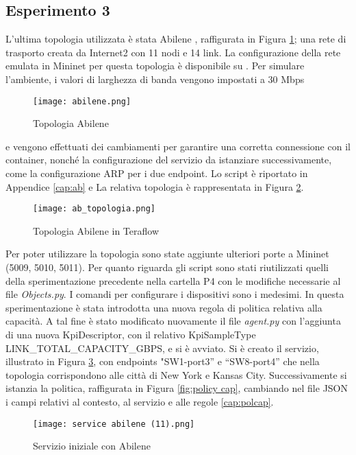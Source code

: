 \subsection{Esperimento 3}
L'ultima topologia utilizzata è stata Abilene \cite{abilene}, raffigurata in Figura \ref{fig:ab}; una rete di trasporto creata da Internet2 con 11 nodi e 14 link.
La configurazione della rete emulata in Mininet per questa topologia è disponibile su \cite{topab}. 
Per simulare l'ambiente, i valori di larghezza di banda vengono impostati a 30 Mbps
\begin{figure}[h]
    \centering
   \texttt{[image: abilene.png]}
    \caption{Topologia Abilene}
    \label{fig:ab}
\end{figure}
e vengono effettuati dei cambiamenti 
per garantire una corretta connessione con il container, nonché la configurazione del servizio da istanziare successivamente, come la configurazione ARP per i due endpoint.
Lo script è riportato in Appendice \ref{cap:ab} e La relativa topologia è rappresentata in Figura \ref{fig:d}. 
\begin{figure}[h]
    \centering
   \texttt{[image: ab\_topologia.png]}
    \caption{Topologia Abilene in Teraflow}
    \label{fig:d}
\end{figure}
Per poter utilizzare la topologia sono state aggiunte ulteriori porte a Mininet (5009, 5010, 5011).
\newline Per quanto riguarda gli script sono stati riutilizzati quelli della sperimentazione precedente nella cartella P4 \cite{ofc} con le 
modifiche necessarie al file \textit{Objects.py}. 
I comandi per configurare i dispositivi sono i medesimi.
\newline In questa sperimentazione è stata introdotta una nuova regola di politica relativa alla capacità.
A tal fine è stato modificato nuovamente il file \textit{agent.py} con l'aggiunta di una nuova KpiDescriptor, con il relativo KpiSampleType LINK\_TOTAL\_CAPACITY\_GBPS, e si è avviato.
Si è creato il servizio, illustrato in Figura \ref{fig:abilene}, con endpoints "SW1-port3” e “SW8-port4” che nella topologia corrispondono alle città di New York e Kansas City.
Successivamente si istanzia la politica, raffigurata in Figura \ref{fig:policy cap}, cambiando nel file JSON i campi relativi
al contesto, al servizio e alle regole \ref{cap:polcap}.
\begin{figure}[h]
    \centering
   \texttt{[image: service abilene (11).png]}
    \caption{Servizio iniziale con Abilene}
    \label{fig:abilene}
\end{figure}
